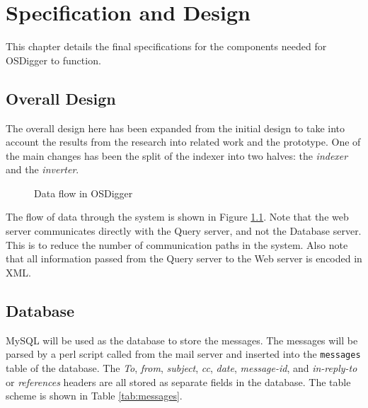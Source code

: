 
\chapter{Specification and Design}
\label{techspec}
This chapter details the final specifications for the components needed for OSDigger to function.

\section{Overall Design}

The overall design here has been expanded from the initial design to take into account the results from the research into related work and the prototype.  One of the main changes has been the split of the indexer into two halves: the \emph{indexer} and the \emph{inverter}.  

\begin{figure}[htbp]
  \begin{center}
    \caption{Data flow in OSDigger}
    \label{fig:dataflow}
  \end{center}
\end{figure}

The flow of data through the system is shown in Figure \ref{fig:dataflow}.  Note that the web server communicates directly with the Query server, and not the Database server.  This is to reduce the number of communication paths in the system.  Also note that all information passed from the Query server to the Web server is encoded in XML.

\section{Database}
\label{sec:db}
MySQL will be used as the database to store the messages.  The messages will be parsed by a perl script called from the mail server and inserted into the \texttt{messages} table of the database.  The \emph{To}, \emph{from}, \emph{subject}, \emph{cc}, \emph{date}, \emph{message-id}, and \emph{in-reply-to} or \emph{references} headers are all stored as separate fields in the database.  The table scheme is shown in Table \ref{tab:messages}.

